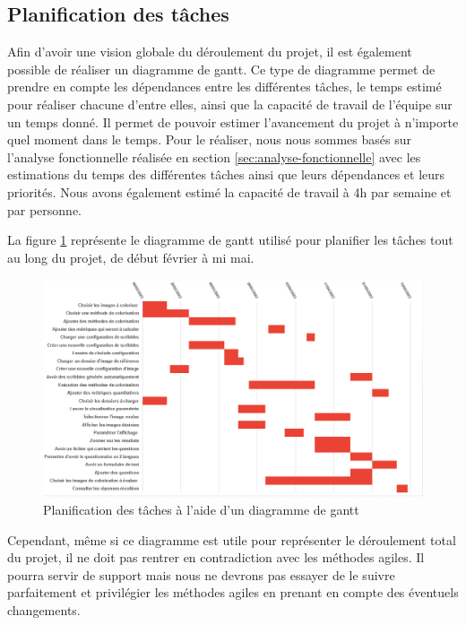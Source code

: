 \documentclass{article}
\begin{document}
\subsection{Planification des tâches}\label{sec:gantt}

Afin d'avoir une vision globale du déroulement du projet, il est également possible de réaliser un diagramme de gantt.
Ce type de diagramme permet de prendre en compte les dépendances entre les différentes tâches, le temps estimé pour réaliser chacune 
d'entre elles, ainsi que la capacité de travail de l'équipe sur un temps donné.
Il permet de pouvoir estimer l'avancement du projet à n'importe quel moment dans le temps. Pour le réaliser, nous nous sommes basés
sur l'analyse fonctionnelle réalisée en section \ref{sec:analyse-fonctionnelle} avec les estimations du temps des différentes tâches ainsi
que leurs dépendances et leurs priorités. Nous avons également estimé la capacité de travail à 4h par semaine et par personne. 

La figure \ref{fig:gantt} représente le diagramme de gantt utilisé pour planifier les tâches tout au long du projet, de début février à mi mai.

\begin{figure}[!ht]
    \centering
    \includegraphics[width=15cm]{gantt.png}
    \caption{Planification des tâches à l'aide d'un diagramme de gantt}
    \label{fig:gantt}
\end{figure}

Cependant, même si ce diagramme est utile pour représenter le déroulement total du projet, il ne doit pas rentrer en contradiction avec les méthodes agiles.
Il pourra servir de support mais nous ne devrons pas essayer de le suivre parfaitement et privilégier les méthodes agiles
en prenant en compte des éventuels changements.
\end{document}
